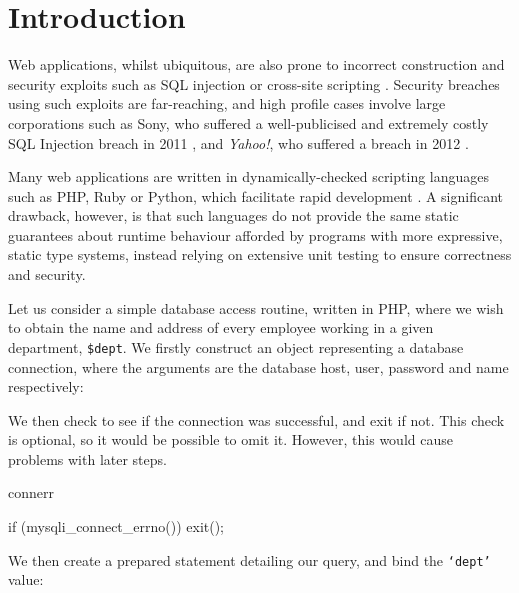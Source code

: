 \section{Introduction}

Web applications, whilst ubiquitous, are also prone to incorrect construction
and security exploits such as SQL injection \cite{owasp:sqli} or cross-site
scripting \cite{owasp:xss}. Security breaches using such exploits are
far-reaching, and high profile cases involve large corporations such as Sony,
who suffered a well-publicised and extremely costly SQL Injection breach in
2011 \cite{ieee:sony}, and \textit{Yahoo!}, who suffered a breach in 2012
\cite{imperva:yahoo}. 

Many web applications are written in dynamically-checked scripting languages
such as PHP, Ruby or Python, which facilitate rapid development
\cite{w3techs:webpls}. A significant drawback, however, is that such languages
do not provide  the same static guarantees about runtime behaviour afforded by
programs with more expressive, static type systems, instead relying on
extensive unit testing to ensure correctness and security. 

Let us consider a simple database access routine, written in
PHP, where we wish to obtain the name and address of every employee working in
a given department, \texttt{\$dept}. We firstly construct an object
representing a database connection, where the arguments are the database host,
user, password and name respectively:


\noindent
We then check to see if the connection was successful, and exit
if not.  This check is optional, so
it would be possible to omit it. However, this would cause
problems with later steps.

\begin{SaveVerbatim}{connerr}

  if (mysqli_connect_errno()) {
      exit();
  }

\end{SaveVerbatim}

\noindent
We then create a prepared statement detailing our query, and bind the
\texttt{`dept'} value:


